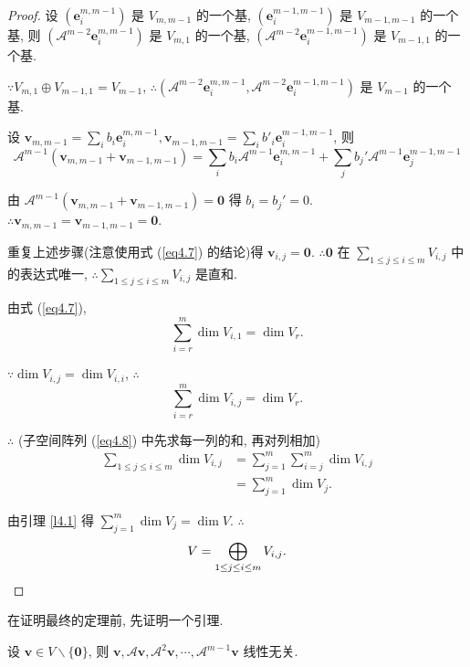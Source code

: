 \documentclass[color=black,device=normal,lang=cn,mode=geye]{elegantnote}
\begin{document}
\begin{proof}
    设 $(\boldsymbol{e}_i^{m,m-1})$ 是 $V_{m,m-1}$ 的一个基, $(\boldsymbol{e}_i^{m-1,m-1})$ 是 $V_{m-1,m-1}$ 的一个基, 则 $(\mathcal{A}^{m-2}\boldsymbol{e}_i^{m,m-1})$ 是 $V_{m,1}$ 的一个基, $(\mathcal{A}^{m-2}\boldsymbol{e}_i^{m-1,m-1})$ 是 $V_{m-1,1}$ 的一个基.

    $\because V_{m,1}\oplus V_{m-1,1}=V_{m-1}$, $\therefore(\mathcal{A}^{m-2}\boldsymbol{e}_i^{m,m-1},\mathcal{A}^{m-2}\boldsymbol{e}_i^{m-1,m-1})$ 是 $V_{m-1}$ 的一个基.

    设 $\boldsymbol{v}_{m,m-1}=\sum\limits_ib_i\boldsymbol{e}_i^{m,m-1},\boldsymbol{v}_{m-1,m-1}=\sum\limits_ib'_i\boldsymbol{e}_i^{m-1,m-1}$, 则
    \[\mathcal{A}^{m-1}(\boldsymbol{v}_{m,m-1}+\boldsymbol{v}_{m-1,m-1})=\sum\limits_ib_i\mathcal{A}^{m-1}\boldsymbol{e}_i^{m,m-1}+\sum\limits_jb_j'\mathcal{A}^{m-1}\boldsymbol{e}_j^{m-1,m-1}\]
    
    由 $\mathcal{A}^{m-1}(\boldsymbol{v}_{m,m-1}+\boldsymbol{v}_{m-1,m-1})=\boldsymbol{0}$ 得 $b_i=b_j'=0$. $\therefore\boldsymbol{v}_{m,m-1}=\boldsymbol{v}_{m-1,m-1}=\boldsymbol{0}$.

    重复上述步骤(注意使用式 (\ref{eq4.7}) 的结论)得 $\boldsymbol{v}_{i,j}=\boldsymbol{0}$. $\therefore\boldsymbol{0}$ 在 $\sum\limits_{1\leq j\leq i\leq m}V_{i,j}$ 中的表达式唯一, $\therefore\sum\limits_{1\leq j\leq i\leq m}V_{i,j}$ 是直和.

    由式 (\ref{eq4.7}),
    \[\sum\limits_{i=r}^m\dim V_{i,1}=\dim V_r.\]

    $\because\dim V_{i,j}=\dim V_{i,i}$, $\therefore$
    \[\sum\limits_{i=r}^m\dim V_{i,j}=\dim V_r.\]

    $\therefore$ (子空间阵列 (\ref{eq4.8}) 中先求每一列的和, 再对列相加)
    \begin{align*}
        \sum\limits_{1\leq j\leq i\leq m}\dim V_{i,j} & =\sum\limits_{j=1}^m\sum\limits_{i=j}^m\dim V_{i,j} \\
        & =\sum\limits_{j=1}^m\dim V_j.
    \end{align*}

    由引理 \ref{l4.1} 得 $\sum\limits_{j=1}^m\dim V_j=\dim V$. $\therefore$
    \[V=\bigoplus\limits_{1\leq j\leq i\leq m}V_{i,j}.\qedhere\]
\end{proof}
在证明最终的定理前, 先证明一个引理.
\begin{lemma}\label{l4.2}
    设 $\boldsymbol{v}\in V\backslash\{\boldsymbol{0}\}$, 则 $\boldsymbol{v},\mathcal{A}\boldsymbol{v},\mathcal{A}^2\boldsymbol{v},\cdots,\mathcal{A}^{m-1}\boldsymbol{v}$ 线性无关.
\end{lemma}
\end{document}
